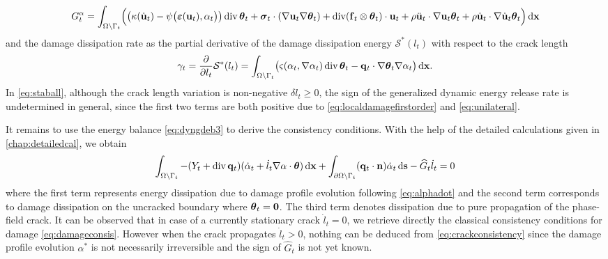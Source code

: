 \begin{equation} \label{eq:GtC}
G_t^\alpha=\int_\domaint\Bigl(\bigl(\kappa(\dot{\vec{u}}_t)-\psi\bigl(\eps(\vec{u}_t),\alpha_t\bigr)\bigr)\div\vtheta_t+\sig_t\cdot(\nabla\vec{u}_t\nabla\vtheta_t)+\div(\vec{f}_t\otimes\vtheta_t)\cdot\vec{u}_t+\rho\ddot{\vec{u}}_t\cdot\nabla\vec{u}_t\vtheta_t+\rho\dot{\vec{u}}_t\cdot\nabla\dot{\vec{u}}_t\vtheta_t\Bigr)\dx
\end{equation}
and the damage dissipation rate as the partial derivative of the damage dissipation energy $\mathcal{S}^*(l_t)$ with respect to the crack length
\begin{equation} \label{eq:Gammat}
\gamma_t=\frac{\partial}{\partial l_t}\mathcal{S}^*(l_t)=\int_\domaint\bigl(\varsigma(\alpha_t,\nabla\alpha_t)\div\vtheta_t-\vec{q}_t\cdot\nabla\vtheta_t\nabla\alpha_t\bigr)\dx.
\end{equation}
In \eqref{eq:staball}, although the crack length variation is non-negative $\delta l_t\geq 0$, the sign of the generalized dynamic energy release rate is undetermined in general, since the first two terms are both positive due to \eqref{eq:localdamagefirstorder} and \eqref{eq:unilateral}.

It remains to use the energy balance \eqref{eq:dyngdeb3} to derive the consistency conditions. With the help of the detailed calculations given in \cref{chap:detailedcal}, we obtain
\begin{equation} \label{eq:crackconsistency}
\int_\domaint-(Y_t+\div\vec{q}_t)(\dot{\alpha}_t+\dot{l}_t\nabla\alpha\cdot\vtheta)\dx+\int_{\partial\Omega\setminus\Gamma_t}(\vec{q}_t\cdot\vec{n})\dot{\alpha}_t\ds-\widehat{G}_t\dot{l}_t=0
\end{equation}
where the first term represents energy dissipation due to damage profile evolution following \eqref{eq:alphadot} and the second term corresponds to damage dissipation on the uncracked boundary where $\vtheta_t=\vec{0}$. The third term denotes dissipation due to pure propagation of the phase-field crack.  It can be observed that in case of a currently stationary crack $\dot{l}_t=0$, we retrieve directly the classical consistency conditions for damage \eqref{eq:damageconsis}. However when the crack propagates $\dot{l}_t>0$, nothing can be deduced from \eqref{eq:crackconsistency} since the damage profile evolution $\alpha^*$ is not necessarily irreversible and the sign of $\widehat{G}_t$ is not yet known.

